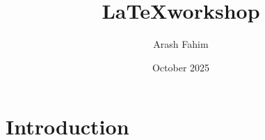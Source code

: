 \documentclass{article}
\title{\LaTeX workshop}
\author{Arash Fahim}
\date{October 2025}
\begin{document}
\maketitle

\section{Introduction}
\end{document}
